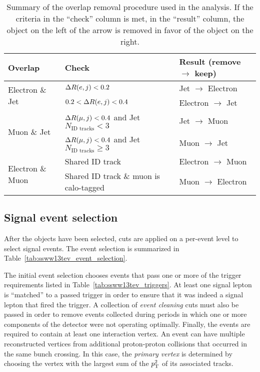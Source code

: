 \begin{table}[htbp]
  \centering
  \begin{tabular}{l l l}
    Overlap         & Check & Result (remove $\rightarrow$ keep) \\
    \hline\hline
    \multirow{2}{*}{Electron \& Jet}  & $\Delta R(e,j) < 0.2$       & Jet $\rightarrow$ Electron \\
                                      & $0.2 < \Delta R(e,j) < 0.4$ & Electron $\rightarrow$ Jet \\
    \hline
    \multirow{2}{*}{Muon \& Jet}      & $\Delta R(\mu,j) < 0.4$ and Jet $N_{\textrm{ID\ tracks}} < 3$
                                                                   & Jet $\rightarrow$ Muon \\
                                      & $\Delta R(\mu,j) < 0.4$ and Jet $N_{\textrm{ID\ tracks}} \ge 3$
                                                                   & Muon $\rightarrow$ Jet \\
    \hline
    \multirow{2}{*}{Electron \& Muon} & Shared ID track            & Electron $\rightarrow$ Muon \\
                                      & Shared ID track \& muon is calo-tagged
                                                                   & Muon $\rightarrow$ Electron \\
    \hline
  \end{tabular}
  \caption{Summary of the overlap removal procedure used in the analysis.  If the criteria in the ``check'' column is met, in the ``result'' column, the object on the left of the arrow is removed in favor of the object on the right.}
  \label{tab:ssww13tev_or}
\end{table}

\subsection{Signal event selection}\label{ssww13tev:event_selection}
After the objects have been selected, cuts are applied on a per-event level to select \ssww signal events.
The event selection is summarized in Table~\ref{tab:ssww13tev_event_selection}. %

The initial event selection chooses events that pass one or more of the trigger requirements listed in Table~\ref{tab:ssww13tev_triggers}.
At least one signal lepton is ``matched'' to a passed trigger in order to ensure that it was indeed a signal lepton that fired the trigger.
A collection of \emph{event cleaning} cuts must also be passed in order to remove events collected during periods in which one or more components of the detector were not operating optimally.
Finally, the events are required to contain at least one interaction vertex.
An event can have multiple reconstructed vertices from additional proton-proton collisions that occurred in the same bunch crossing.
In this case, the \emph{primary vertex} is determined by choosing the vertex with the largest sum of the $p_{\mathrm{T}}^2$ of its associated tracks.

